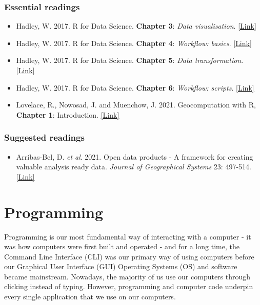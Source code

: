 \documentclass[
]{book}
\providecommand{\tightlist}{%
  \setlength{\itemsep}{0pt}\setlength{\parskip}{0pt}}
\begin{document}
\hypertarget{essential-readings-3}{%
\subsubsection*{Essential readings}\label{essential-readings-3}}

\begin{itemize}
\tightlist
\item
  Hadley, W. 2017. R for Data Science. \textbf{Chapter 3}: \emph{Data visualisation}. \href{https://r4ds.had.co.nz/data-visualisation.html}{{[}Link{]}}
\item
  Hadley, W. 2017. R for Data Science. \textbf{Chapter 4}: \emph{Workflow: basics}. \href{https://r4ds.had.co.nz/workflow-basics.html}{{[}Link{]}}
\item
  Hadley, W. 2017. R for Data Science. \textbf{Chapter 5}: \emph{Data transformation}. \href{https://r4ds.had.co.nz/transform.html}{{[}Link{]}}
\item
  Hadley, W. 2017. R for Data Science. \textbf{Chapter 6}: \emph{Workflow: scripts}. \href{https://r4ds.had.co.nz/workflow-scripts.html}{{[}Link{]}}
\item
  Lovelace, R., Nowosad, J. and Muenchow, J. 2021. Geocomputation with R, \textbf{Chapter 1}: Introduction. \href{https://geocompr.robinlovelace.net/intro.html}{{[}Link{]}}
\end{itemize}

\hypertarget{suggested-readings-3}{%
\subsubsection*{Suggested readings}\label{suggested-readings-3}}

\begin{itemize}
\tightlist
\item
  Arribas-Bel, D. \emph{et al}. 2021. Open data products - A framework for creating valuable analysis ready data. \emph{Journal of Geographical Systems} 23: 497-514. \href{https://doi.org/10.1007/s10109-021-00363-5}{{[}Link{]}}
\end{itemize}

\hypertarget{programming}{%
\section{Programming}\label{programming}}

Programming is our most fundamental way of interacting with a computer - it was how computers were first built and operated - and for a long time, the Command Line Interface (CLI) was our primary way of using computers before our Graphical User Interface (GUI) Operating Systems (OS) and software became mainstream. Nowadays, the majority of us use our computers through clicking instead of typing. However, programming and computer code underpin every single application that we use on our computers.
\end{document}

